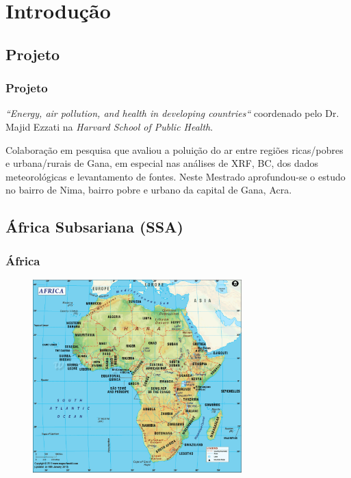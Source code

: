 \section{Introdução}

\subsection{Projeto}
\begin{frame}
  \frametitle{Projeto}
   \begin{tcolorbox}[colback=blue!5,colframe=blue!40!black,title=Projeto Internacional]
    \textit{``Energy, air pollution, and health in developing countries``}
             coordenado pelo Dr. Majid Ezzati na \textit{Harvard School of Public Health}.
   \end{tcolorbox}
   
   \begin{tcolorbox}[colback=blue!5,colframe=blue!40!black,title=Mestrado em Nima]
   	  Colaboração em pesquisa que avaliou a poluição do ar entre regiões ricas/pobres e urbana/rurais de Gana, em especial nas análises de XRF, BC, dos dados meteorológicas e levantamento de fontes. Neste Mestrado aprofundou-se o estudo no bairro de Nima, bairro pobre e urbano da capital de Gana, Acra.    
      \end{tcolorbox}
\end{frame}

\subsection{África Subsariana (SSA)}
\begin{frame}
  \frametitle{África}
  \begin{figure}[H]
    \includegraphics[width=0.72\textwidth]{../../inputs/images/africa-map.pdf}
  \end{figure}
\end{frame}

